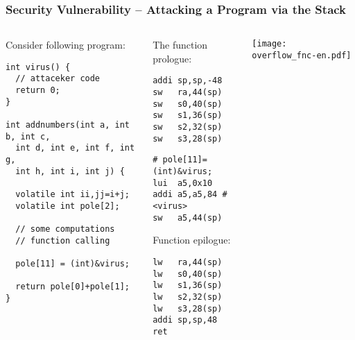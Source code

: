 \documentclass{beamer}
\begin{document}
\begin{frame}[fragile,shrink=5]
\frametitle{Security Vulnerability  -- Attacking a Program via the Stack}

\begin{columns}
\begin{column}{0.42\textwidth}
Consider following program:

\begin{verbatim}
int virus() {
  // attaceker code
  return 0;
}

int addnumbers(int a, int b, int c, 
  int d, int e, int f, int g, 
  int h, int i, int j) {
  
  volatile int ii,jj=i+j;
  volatile int pole[2];
  
  // some computations
  // function calling
  
  pole[11] = (int)&virus;
  
  return pole[0]+pole[1];
}
\end{verbatim}
\end{column}   
\begin{column}{0.25\textwidth}
The function prologue:

\begin{verbatim}
addi sp,sp,-48
sw   ra,44(sp)
sw   s0,40(sp)
sw   s1,36(sp)
sw   s2,32(sp)
sw   s3,28(sp)
\end{verbatim}


\begin{verbatim}
# pole[11]=(int)&virus;
lui  a5,0x10
addi a5,a5,84 # <virus>
sw   a5,44(sp)
\end{verbatim}

Function epilogue:

\begin{verbatim}
lw   ra,44(sp)
lw   s0,40(sp)
lw   s1,36(sp)
lw   s2,32(sp)
lw   s3,28(sp)
addi sp,sp,48
ret
\end{verbatim}
\end{column}
\begin{column}{0.33\textwidth}  
\texttt{[image: overflow\_fnc-en.pdf]}
\end{column}
\end{columns}
\end{frame}
\end{document}
